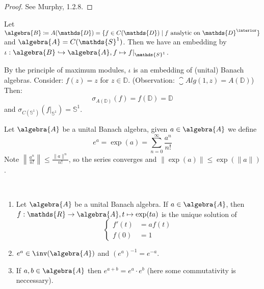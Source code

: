 \documentclass[a4paper]{article}
\begin{document}
\begin{proof}
	See Murphy, 1.2.8.
\end{proof}

\begin{example}
	Let $\algebra{B} \coloneq A(\mathds{D}) = \{f \in C(\mathds{D}) \mid f \text{ analytic on } \mathds{D}^\interior\}$ and $\algebra{A} = C(\mathds{S}^1)$.
	Then we have an embedding by $\iota: \algebra{B} \hookrightarrow \algebra{A}, f \mapsto f|_{\mathds{S}^1}$.

	By the principle of maximum modules, $\iota$ is an embedding of (unital) Banach algebras.
	Consider: $f(z) = z$ for $z \in \mathds{D}$.
	(Observation: $\closure{Alg}(1,z) = A(\mathds{D})$)
	Then:
	\begin{equation*}
		\sigma_{A(\mathds{D})}(f) = f(\mathds{D}) = \mathds{D}
	\end{equation*}
	and $\sigma_{C(\mathds{S}^1)}(f|_{\mathds{S}^1}) = \mathds{S}^1$.
\end{example}

\begin{definition}[Exponentials]
	Let $\algebra{A}$ be a unital Banach algebra, given $a \in \algebra{A}$ we define
	\begin{equation*}
		e^a = \exp(a) = \sum_{n = 0}^{\infty} \frac{a^n}{n!}
	\end{equation*}
	Note $\left\| \frac{a^n}{n!} \right\| \leq \frac{\|a\|^n}{n!}$, so the series converges and $\| \exp(a) \| \leq \exp(\|a\|)$.
\end{definition}

\begin{theorem}~
	\begin{enumerate}
		\item Let $\algebra{A}$ be a unital Banach algebra. If $a \in \algebra{A}$, then $f: \mathds{R} \to \algebra{A}, t \mapsto \exp(ta)$ is the unique solution of
		      \begin{equation*}
			      \left\{ \begin{matrix}
				      f'(t) & = a f(t) \\
				      f(0)  & = 1
			      \end{matrix} \right.
		      \end{equation*}
		\item $e^a \in \inv(\algebra{A})$ and $(e^a)^{-1} = e^{-a}$.
		\item If $a,b \in \algebra{A}$ then $e^{a + b} = e^a \cdot e^b$ (here some commutativity is neccessary).
	\end{enumerate}
\end{theorem}
\end{document}

